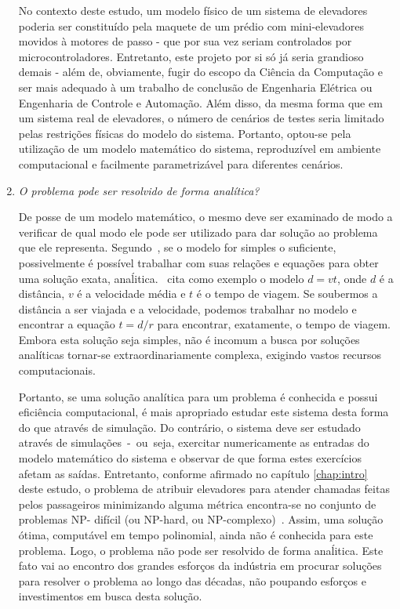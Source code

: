 \begin{enumerate}
No contexto deste estudo, um modelo físico de um sistema de elevadores poderia
ser constituído pela maquete de um prédio com mini-elevadores movidos à motores
de passo - que por sua vez seriam controlados por microcontroladores.
Entretanto, este projeto por si só já seria grandioso demais - além de,
obviamente, fugir do escopo da Ciência da Computação e ser mais adequado à um
trabalho de conclusão de Engenharia Elétrica ou Engenharia de Controle e
Automação. Além disso, da mesma forma que em um sistema real de elevadores, o
número de cenários de testes seria limitado pelas restrições físicas do modelo
do sistema. Portanto, optou-se pela utilização de um modelo matemático do
sistema, reproduzível em ambiente computacional e facilmente parametrizável para
diferentes cenários.

\item \textit{O problema pode ser resolvido de forma analítica?}

De posse de um modelo matemático, o mesmo deve ser examinado de modo a verificar
de qual modo ele pode ser utilizado para dar solução ao problema que ele
representa. Segundo~\cite{Law}, se o modelo for simples o suficiente,
possivelmente é possível trabalhar com suas relações e equações para obter uma
solução exata, anaĺitica.~\cite{Law} cita como exemplo o modelo $d = vt$, onde
$d$ é a distância, $v$ é a velocidade média e $t$ é o tempo de viagem. Se
soubermos a distância a ser viajada e a velocidade, podemos trabalhar no modelo
e encontrar a equação $t = d/r$ para encontrar, exatamente, o tempo de viagem.
Embora esta solução seja simples, não é incomum a busca por soluções analíticas
tornar-se extraordinariamente complexa, exigindo vastos recursos computacionais.

Portanto, se uma solução analítica para um problema é conhecida e possui
eficiência computacional, é mais apropriado estudar este sistema desta forma do
que através de simulação. Do contrário, o sistema deve ser estudado através de
simulações~-~ou~seja, exercitar numericamente as entradas do modelo matemático
do sistema e observar de que forma estes exercícios afetam as saídas.
Entretanto, conforme afirmado no capítulo \ref{chap:intro} deste estudo, o
problema de atribuir elevadores para atender chamadas feitas pelos passageiros
minimizando alguma métrica encontra-se no conjunto de problemas NP- difícil (ou
NP-hard, ou NP-complexo)~\cite{SeKo99}. Assim, uma solução ótima, computável em
tempo polinomial, ainda não é conhecida para este problema. Logo, o problema não
pode ser resolvido de forma anaĺitica. Este fato vai ao encontro dos grandes
esforços da indústria em procurar soluções para resolver o problema ao longo das
décadas, não poupando esforços e investimentos em busca desta solução.

\end{enumerate}

